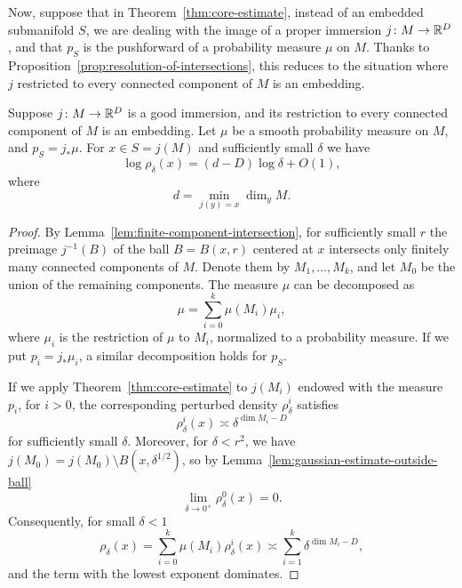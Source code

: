 Now, suppose that in Theorem~\ref{thm:core-estimate}, instead of an embedded submanifold $S$, we are dealing with the image of a proper immersion $j\colon M\to \mathbb{R}^D$, and that $p_S$ is the pushforward of a probability measure $\mu$ on $M$. Thanks to Proposition~\ref{prop:resolution-of-intersections}, this reduces to the situation where $j$ restricted to every connected component of $M$ is an embedding.

\begin{proposition}
    Suppose $j\colon M\to \mathbb{R}^D$ is a good immersion, and its restriction to every connected component of $M$ is an embedding. Let $\mu$ be a smooth probability measure on $M$, and $p_S=j_*\mu$. For $x\in S = j(M)$ and sufficiently small $\delta$ we have
    \begin{equation}
        \log\rho_\delta(x) = (d-D)\log\delta + O(1),
    \end{equation}
    where 
    \begin{equation}
        d = \min_{j(y)=x} \dim_y M.
    \end{equation}
\end{proposition}

\begin{proof}
    By Lemma~\ref{lem:finite-component-intersection}, for sufficiently small $r$ the preimage $j^{-1}(B)$ of the ball $B=B(x,r)$ centered at $x$ intersects only finitely many connected components of $M$. Denote them by $M_1,\dots, M_k$, and let $M_0$ be the union of the remaining components. The measure $\mu$ can be decomposed as
    \begin{equation}
        \mu = \sum_{i=0}^k \mu(M_i)\mu_i,
    \end{equation}
    where $\mu_i$ is the restriction of $\mu$ to $M_i$, normalized to a probability measure. If we put $p_i = j_*\mu_i$, a similar decomposition holds for $p_S$.
    
    If we apply Theorem~\ref{thm:core-estimate} to $j(M_i)$ endowed with the measure $p_i$, for $i>0$, the corresponding perturbed density $\rho^i_\delta$ satisfies
    \begin{equation}
        \rho^i_\delta(x) \asymp \delta^{\dim{M_i}-D}
    \end{equation}
    for sufficiently small $\delta$. Moreover, for $\delta < r^2$, we have $j(M_0) = j(M_0)\setminus B(x,\delta^{1/2})$, so by Lemma~\ref{lem:gaussian-estimate-outside-ball}
    \begin{equation}
        \lim_{\delta\to 0^+} \rho^0_\delta(x) = 0.
    \end{equation}
    Consequently, for small $\delta<1$
    \begin{equation}
        \rho_\delta(x) = \sum_{i=0}^k \mu(M_i)\rho^i_\delta(x) \asymp \sum_{i=1}^k \delta^{\dim{M_i}-D},
    \end{equation}
    and the term with the lowest exponent dominates.
\end{proof}
  
